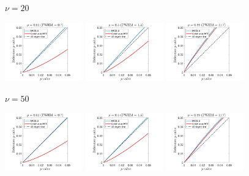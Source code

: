 \documentclass{article}
\begin{document}
\begin{figure}[!htp]
\centering
\begin{sideways}
\phantom{------------------}$\nu = 20$
\end{sideways}
\includegraphics[trim=70 5 100 5, clip,width=0.3\textwidth]{figure/3D_nu20_rho0.01_gauss.jpg}
\includegraphics[trim=70 5 100 5, clip,width=0.3\textwidth]{figure/3D_nu20_rho0.5_gauss.jpg}
\includegraphics[trim=70 5 100 5, clip,width=0.3\textwidth]{figure/3D_nu20_rho0.99_gauss.jpg}

\begin{sideways}
\phantom{------------------}$\nu = 50$
\end{sideways}
\includegraphics[trim=70 5 100 5, clip,width=0.3\textwidth]{figure/3D_nu50_rho0.01_gauss.jpg}
\includegraphics[trim=70 5 100 5, clip,width=0.3\textwidth]{figure/3D_nu50_rho0.5_gauss.jpg}
\includegraphics[trim=70 5 100 5, clip,width=0.3\textwidth]{figure/3D_nu50_rho0.99_gauss.jpg}


\end{figure}
\end{document}
